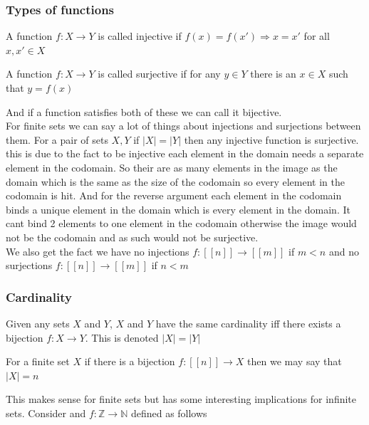 \documentclass{article}
\begin{document}
\subsubsection{Types of functions}
\begin{definition}
    A function $f:X \to Y$ is called injective if $f(x) = f(x') \Rightarrow x = x'$ for all $x,x' \in X$
\end{definition}
\begin{definition}
    A function $f:X \to Y$ is called surjective if for any $y \in Y$ there is an $x \in X$ such that $y = f(x)$
\end{definition}
And if a function satisfies both of these we can call it bijective.
\\
For finite sets we can say a lot of things about injections and surjections between them. For a pair of sets $X,Y$ if $|X| = |Y|$ then any injective function is surjective. this is due to the fact to be injective each element in the domain needs a separate element in the codomain. So their are as many elements in the image as the domain which is the same as the size of the codomain so every element in the codomain is hit. And for the reverse argument each element in the codomain binds a unique element in the domain which is every element in the domain. It cant bind 2 elements to one element in the codomain otherwise the image would not be the codomain and as such would not be surjective.
\\
We also get the fact we have no injections $f:[[n]] \to [[m]]$ if $m < n$ and no surjections $f:[[n]] \to [[m]]$ if $n<m$

\subsubsection{Cardinality}
\begin{definition}
    Given any sets $X$ and $Y$, $X$ and $Y$ have the same cardinality iff there exists a bijection $f:X \to Y$. This is denoted $|X| = |Y|$ 
\end{definition}
\begin{definition}
    For a finite set $X$ if there is a bijection $f:[[n]] \to X$ then we may say that $|X| = n$
\end{definition}
This makes sense for finite sets but has some interesting implications for infinite sets. Consider and $f:\mathbb{Z} \to \mathbb{N}$ defined as follows
\end{document}
